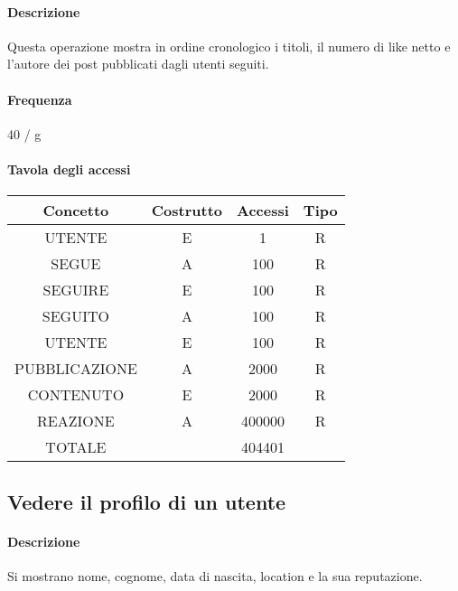 \documentclass[a4paper,12pt]{report}
\begin{document}
\paragraph{Descrizione} Questa operazione mostra in ordine cronologico i titoli, il numero di like netto e l'autore dei post pubblicati dagli utenti seguiti.
\paragraph{Frequenza} 40 / g
\begin{table}[H]
\paragraph{Tavola degli accessi\newline}
\begin{tabular}{|c|c|c|c|}
\hline
Concetto      & Costrutto & Accessi & Tipo \\ \hline
UTENTE        & E         & 1       & R    \\ \hline
SEGUE         & A         & 100     & R    \\ \hline
SEGUIRE       & E         & 100     & R    \\ \hline
SEGUITO       & A         & 100     & R    \\ \hline
UTENTE        & E         & 100     & R    \\ \hline
PUBBLICAZIONE & A         & 2000    & R    \\ \hline
CONTENUTO     & E         & 2000    & R    \\ \hline
REAZIONE      & A         & 400000  & R    \\ \hline
TOTALE        &           & 404401  &      \\ \hline
\end{tabular}
\end{table}
\subsection{Vedere il profilo di un utente} \label{vedere_profilo}
\paragraph{Descrizione} Si mostrano nome, cognome, data di nascita, location e la sua reputazione.
\end{document}
